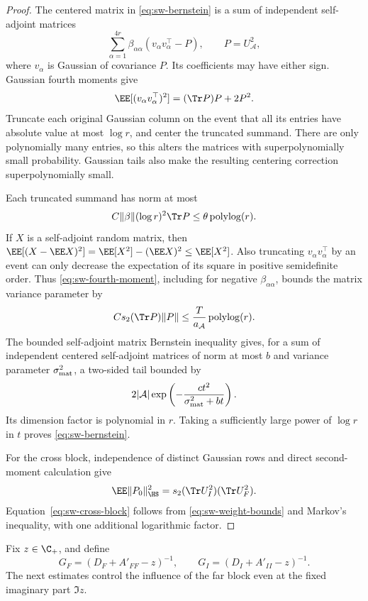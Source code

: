 \begin{proof}
The centered matrix in \eqref{eq:sw-bernstein} is a sum of independent
self-adjoint matrices
\[
 \sum_{\alpha=1}^{4r}\beta_{\alpha\alpha}
       (v_\alpha v_\alpha^\top-P),\qquad P=U_{\mathcal A}^2,
\]
where \(v_\alpha\) is Gaussian of covariance \(P\).
Its coefficients may have either sign. Gaussian fourth moments give
\begin{equation}\label{eq:sw-fourth-moment}
 \EE[(v_\alpha v_\alpha^\top)^2]
   =(\Tr P)P+2P^2.
\end{equation}
Truncate each original Gaussian column on the event that all its entries
have absolute value at most \(\log r\), and center the truncated summand.
There are only polynomially many entries, so this alters the matrices with
superpolynomially small probability. Gaussian tails also make the resulting
centering correction superpolynomially small.

Each truncated summand has norm at most
\[
 C\|\beta\|(\log r)^2\Tr P
 \le \theta\operatorname{polylog}(r).
\]
If \(X\) is a self-adjoint random matrix, then
\(\EE[(X-\EE X)^2]=\EE[X^2]-(\EE X)^2\le\EE[X^2]\).
Also truncating \(v_\alpha v_\alpha^\top\) by an event can only decrease
the expectation of its square in positive semidefinite order.
Thus \eqref{eq:sw-fourth-moment}, including for negative
\(\beta_{\alpha\alpha}\), bounds the matrix variance parameter by
\[
 C s_2(\Tr P)\|P\|
 \le \frac{T}{a_{\mathcal A}}\operatorname{polylog}(r).
\]
The bounded self-adjoint matrix Bernstein inequality
\citep[Theorem~1.4]{Tropp} gives, for a sum of independent centered
self-adjoint matrices of norm at most \(b\) and variance parameter
\(\sigma_{\rm mat}^2\), a two-sided tail bounded by
\[
 2|\mathcal A|\exp\left(
 -\frac{c t^2}{\sigma_{\rm mat}^2+bt}\right).
\]
Its dimension factor is polynomial in \(r\). Taking a sufficiently large
power of \(\log r\) in \(t\) proves \eqref{eq:sw-bernstein}.

For the cross block, independence of distinct Gaussian rows and direct
second-moment calculation give
\[
 \EE\|P_0\|_{\HS}^2
 =s_2(\Tr U_I^2)(\Tr U_F^2).
\]
Equation~\eqref{eq:sw-cross-block} follows from
\eqref{eq:sw-weight-bounds} and Markov's inequality, with one additional
logarithmic factor.
\end{proof}

Fix \(z\in\C_+\), and define
\[
 G_F=(D_F+A'_{FF}-z)^{-1},\qquad
 G_I=(D_I+A'_{II}-z)^{-1}.
\]
The next estimates control the influence of the far block even at the fixed
imaginary part \(\Im z\).

